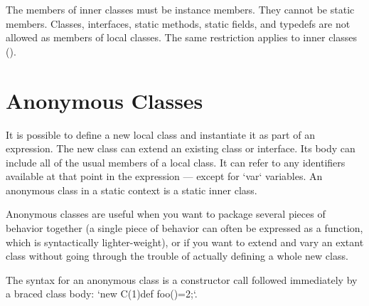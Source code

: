 The members of inner classes must be instance members.  They cannot be static
members.  Classes, interfaces, static methods, static fields, and typedefs are
not allowed as members of local classes. 
The same restriction applies to inner classes (). 





\section{Anonymous Classes}

It is possible to define a new local class and instantiate it as part of an
expression.  The new class can extend an existing class or interface.  Its body
can include all of the usual members of a local class. It can refer to any
identifiers available at that point in the expression --- except for \xcd`var`
variables.  An anonymous class in a static context is a static inner class.

Anonymous classes are useful when you want to package several pieces of
behavior together (a single piece of behavior can often be expressed as a
function, which is syntactically lighter-weight), or if you want to extend and
vary an extant class without going through the trouble of actually defining a
whole new class.

The syntax for an anonymous class is a constructor call followed immediately
by a braced class body: \xcd`new C(1){def foo()=2;}`.

